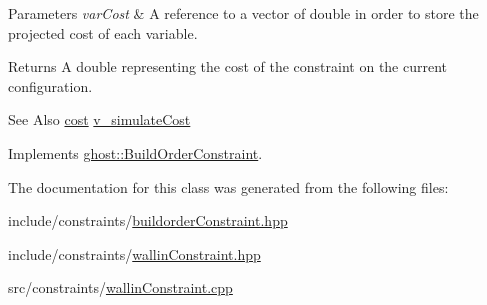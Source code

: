 \begin{DoxyParams}{Parameters}
{\em var\-Cost} & A reference to a vector of double in order to store the projected cost of each variable. \\
\hline
\end{DoxyParams}
\begin{DoxyReturn}{Returns}
A double representing the cost of the constraint on the current configuration. 
\end{DoxyReturn}
\begin{DoxySeeAlso}{See Also}
\hyperlink{classghost_1_1BuildOrderConstraint_a6700969d5de0d199e57fbe3f0a95ed68}{cost} \hyperlink{classghost_1_1BuildOrderConstraint_ad6727d0cf49d366a631fddc5b5ef80cf}{v\-\_\-simulate\-Cost} 
\end{DoxySeeAlso}


Implements \hyperlink{classghost_1_1BuildOrderConstraint_afdcfa9e285cc137841f5fb733f2655e9}{ghost\-::\-Build\-Order\-Constraint}.



The documentation for this class was generated from the following files\-:\begin{DoxyCompactItemize}
\item 
include/constraints/\hyperlink{buildorderConstraint_8hpp}{buildorder\-Constraint.\-hpp}\item 
include/constraints/\hyperlink{wallinConstraint_8hpp}{wallin\-Constraint.\-hpp}\item 
src/constraints/\hyperlink{wallinConstraint_8cpp}{wallin\-Constraint.\-cpp}\end{DoxyCompactItemize}
